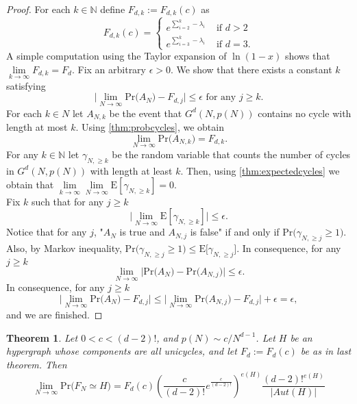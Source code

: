 \documentclass[11pt,notitlepage,a4paper]{article}
\newtheorem{theorem}{Theorem}[section]
\theoremstyle{definition}
\newcommand{\N}{\mathbb{N}}
\newcommand{\LN}{\lim\limits_{N\to \infty}}
\begin{document}
\begin{proof}
	For each $k\in \N$ define $F_{d,k}:=F_{d,k}(c)$ as 
	\[
	F_{d,k}(c)=\begin{cases}
	e^{\sum_{i=2}^k -\lambda_i} 
	& \text{ if } d>2\\
	e^{\sum_{i=3}^k -\lambda_i} 
	& \text{ if } d=3.
	\end{cases}
	\]
	A simple computation using the Taylor expansion
	of $\ln(1-x)$ shows that $\lim\limits_{k\to \infty} F_{d,k}=F_d$.
	Fix an arbitrary $\epsilon>0$. We show that there exists a 
	constant $k$ satisfying
	\[
	\Big| \LN \mathrm{Pr}\big(A_N \big) - F_{d,j} \Big|\leq \epsilon 
	\text{ for any } j\geq k.
	\]
	For each $k\in N$ let $A_{N,k}$ be the event that $G^d(N,p(N))$ contains 
	no cycle with length at most $k$. Using \cref{thm:probcycles}, we obtain 
	\[
	\LN \mathrm{Pr}\big(A_{N,k}\big)=F_{d,k}.\]
	For any $k\in \N$ let $\gamma_{N,\geq k}$ be the random variable that
	counts the number of cycles in $G^d(N,p(N))$ with length at least $k$. 
	Then, using \cref{thm:expectedcycles} we obtain that 
	$\lim\limits_{k\to \infty}	\LN \mathrm{E}[\gamma_{N,\geq k}]=0$. \\
	Fix $k$ such that for any $j\geq k$
	\[
	\Big|\LN \mathrm{E}[\gamma_{N,\geq k}]\Big| \leq \epsilon.
	\]
	Notice that for any $j$, "$A_N$ is true and $A_{N,j}$ is false"
	if and only if $\mathrm{Pr}\big(\gamma_{N,\geq j} \geq 1\big)$. 
	Also, by Markov inequality, 
	$\mathrm{Pr}\big(\gamma_{N,\geq j} \geq 1\big)
	\leq \mathrm{E}\big[\gamma_{N,\geq j}\big]$.
	In consequence, for any $j\geq k$
	\[
	\LN \Big|\mathrm{Pr}\big(A_N\big)- \mathrm{Pr}\big(A_{N,j}\big)\Big|
	\leq \epsilon.
	\]
	In consequence, for any $j\geq k$
	\[ \Big| \LN \mathrm{Pr}\big(A_N \big) - F_{d,j} \Big|
	\leq  \Big| \LN \mathrm{Pr}\big(A_{N,j} \big) - F_{d,j} \Big| +
	\epsilon = \epsilon,	
	\]
	and we are finished. 
\end{proof}


\begin{theorem} 
	Let $0<c<(d-2)!$, and $p(N)\sim c/N^{d-1}$.
	Let $H$ be an hypergraph whose components are all 
	unicycles, and let  $F_d:=F_d(c)$ be as in last theorem. 
	Then
	\[
	\LN \mathrm{Pr}\Big(F_N\simeq H\Big)=F_d(c)\left(
	\frac{c}{(d-2)!}e^{\frac{c}{(d-2)!}}\right)^{e(H)} \frac{(d-2)!^{e(H)}}{|Aut(H)|}
	\]
\end{theorem}
\end{document}
